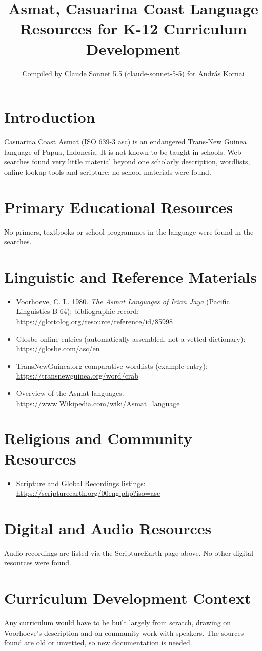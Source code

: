 \documentclass[12pt]{article}
\title{Asmat, Casuarina Coast Language Resources for K-12 Curriculum Development}
\author{Compiled by Claude Sonnet 5.5 (claude-sonnet-5-5) for Andr\'as Kornai}
\date{}
\begin{document}
\maketitle
\section{Introduction}
Casuarina Coast Asmat (ISO 639-3 asc) is an endangered Trans-New Guinea language of Papua, Indonesia. It is not known to be taught in schools. Web searches found very little material beyond one scholarly description, wordlists, online lookup tools and scripture; no school materials were found.
\section{Primary Educational Resources}
No primers, textbooks or school programmes in the language were found in the searches.
\section{Linguistic and Reference Materials}
\begin{itemize}
\item Voorhoeve, C. L. 1980. \emph{The Asmat Languages of Irian Jaya} (Pacific Linguistics B-64); bibliographic record: \url{https://glottolog.org/resource/reference/id/85998}
\item Glosbe online entries (automatically assembled, not a vetted dictionary): \url{https://glosbe.com/asc/en}
\item TransNewGuinea.org comparative wordlists (example entry): \url{https://transnewguinea.org/word/crab}
\item Overview of the Asmat languages: \url{https://www.Wikipedia.com/wiki/Asmat_language}
\end{itemize}
\section{Religious and Community Resources}
\begin{itemize}
\item Scripture and Global Recordings listings: \url{https://scriptureearth.org/00eng.php?iso=asc}
\end{itemize}
\section{Digital and Audio Resources}
Audio recordings are listed via the ScriptureEarth page above. No other digital resources were found.
\section{Curriculum Development Context}
Any curriculum would have to be built largely from scratch, drawing on Voorhoeve's description and on community work with speakers. The sources found are old or unvetted, so new documentation is needed.
\end{document}
